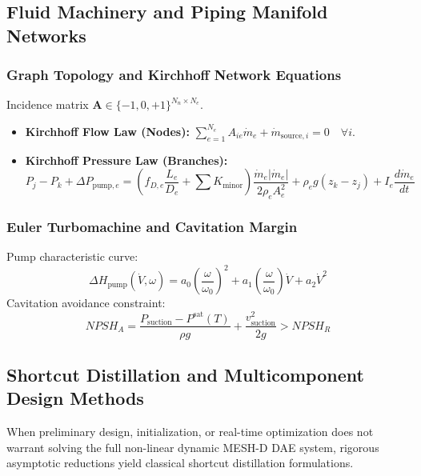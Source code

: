 \documentclass[11pt,a4paper]{article}
\begin{document}
\subsection{Fluid Machinery and Piping Manifold Networks}

\subsubsection{Graph Topology and Kirchhoff Network Equations}
Incidence matrix $\mathbf{A} \in \{-1, 0, +1\}^{N_n \times N_e}$.
\begin{itemize}[leftmargin=*]
    \item \textbf{Kirchhoff Flow Law (Nodes):} $\sum_{e=1}^{N_e} A_{ie} \dot{m}_e + \dot{m}_{\text{source},i} = 0 \quad \forall i$.
    \item \textbf{Kirchhoff Pressure Law (Branches):}
    \begin{equation}
    P_j - P_k + \Delta P_{\text{pump},e} = \left( f_{D,e} \frac{L_e}{D_e} + \sum K_{\text{minor}} \right) \frac{\dot{m}_e |\dot{m}_e|}{2 \rho_e A_e^2} + \rho_e g (z_k - z_j) + I_e \frac{d \dot{m}_e}{dt}
    \end{equation}
\end{itemize}

\subsubsection{Euler Turbomachine and Cavitation Margin}
Pump characteristic curve:
\begin{equation}
\Delta H_{\text{pump}}(\dot{V}, \omega) = a_0 \left( \frac{\omega}{\omega_0} \right)^2 + a_1 \left( \frac{\omega}{\omega_0} \right) \dot{V} + a_2 \dot{V}^2
\end{equation}
Cavitation avoidance constraint:
\begin{equation}
NPSH_A = \frac{P_{\text{suction}} - P^{\text{sat}}(T)}{\rho g} + \frac{v_{\text{suction}}^2}{2 g} > NPSH_R
\end{equation}


\subsection{Shortcut Distillation and Multicomponent Design Methods}

When preliminary design, initialization, or real-time optimization does not warrant solving the full non-linear dynamic MESH-D DAE system, rigorous asymptotic reductions yield classical shortcut distillation formulations.
\end{document}
